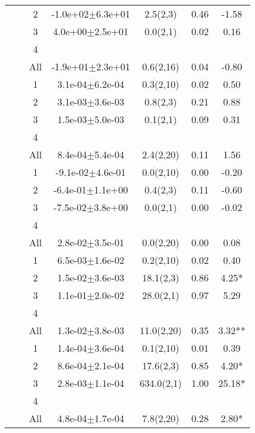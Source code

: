 \begin{longtable}{llccccS[table-format=-2.2, table-space-text-post = {***}]}
   &  & 2 & -1.0e+02$\pm$6.3e+01 & 2.5(2,3) & 0.46 & -1.58 \\ 
   &  & 3 &  4.0e+00$\pm$2.5e+01 & 0.0(2,1) & 0.02 & 0.16 \\ 
   &  & 4 &  &  &  &  \\ 
   &  & All & -1.9e+01$\pm$2.3e+01 & 0.6(2,16) & 0.04 & -0.80 \\ 
   \midrule
{} & {} & 1 &  3.1e-04$\pm$6.2e-04 & 0.3(2,10) & 0.02 & 0.50 \\ 
   &  & 2 &  3.1e-03$\pm$3.6e-03 & 0.8(2,3) & 0.21 & 0.88 \\ 
   &  & 3 &  1.5e-03$\pm$5.0e-03 & 0.1(2,1) & 0.09 & 0.31 \\ 
   &  & 4 &  &  &  &  \\ 
   &  & All &  8.4e-04$\pm$5.4e-04 & 2.4(2,20) & 0.11 & 1.56 \\ 
   \midrule
{} & {} & 1 & -9.1e-02$\pm$4.6e-01 & 0.0(2,10) & 0.00 & -0.20 \\ 
   &  & 2 & -6.4e-01$\pm$1.1e+00 & 0.4(2,3) & 0.11 & -0.60 \\ 
   &  & 3 & -7.5e-02$\pm$3.8e+00 & 0.0(2,1) & 0.00 & -0.02 \\ 
   &  & 4 &  &  &  &  \\ 
   &  & All &  2.8e-02$\pm$3.5e-01 & 0.0(2,20) & 0.00 & 0.08 \\ 
   \midrule
{} & {} & 1 &  6.5e-03$\pm$1.6e-02 & 0.2(2,10) & 0.02 & 0.40 \\ 
   &  & 2 &  1.5e-02$\pm$3.6e-03 & 18.1(2,3) & 0.86 & 4.25* \\ 
   &  & 3 &  1.1e-01$\pm$2.0e-02 & 28.0(2,1) & 0.97 & 5.29 \\ 
   &  & 4 &  &  &  &  \\ 
   &  & All &  1.3e-02$\pm$3.8e-03 & 11.0(2,20) & 0.35 & 3.32** \\ 
   \midrule
{} & {} & 1 &  1.4e-04$\pm$3.6e-04 & 0.1(2,10) & 0.01 & 0.39 \\ 
   &  & 2 &  8.6e-04$\pm$2.1e-04 & 17.6(2,3) & 0.85 & 4.20* \\ 
   &  & 3 &  2.8e-03$\pm$1.1e-04 & 634.0(2,1) & 1.00 & 25.18* \\ 
   &  & 4 &  &  &  &  \\ 
   &  & All &  4.8e-04$\pm$1.7e-04 & 7.8(2,20) & 0.28 & 2.80* \\ 
   \midrule

\end{longtable}

